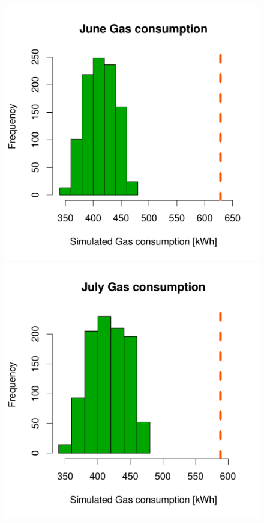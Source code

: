 \documentclass[a4paper, 12pt]{article}
\begin{document}
\begin{figure}
 \includegraphics[width=\scale]{Simulation_histograms/Batch_2_Only/June_Gas}\\
 \includegraphics[width=\scale]{Simulation_histograms/Batch_2_Only/July_Gas}

\end{figure}
\end{document}
